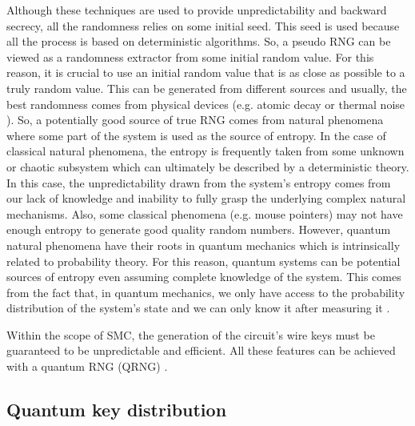 Although these techniques are used to provide unpredictability and backward secrecy, all the randomness relies on some initial seed. This seed is used because all the process is based on deterministic algorithms. So, a pseudo RNG can be viewed as a randomness extractor from some initial random value. For this reason, it is crucial to use an initial random value that is as close as possible to a truly random value. This can be generated from different sources and usually, the best randomness comes from physical devices (e.g. atomic decay \cite{Alkassar2005} or thermal noise \cite{GaviriaRojas2017}). So, a potentially good source of true RNG comes from natural phenomena where some part of the system is used as the source of entropy. In the case of classical natural phenomena, the entropy is frequently taken from some unknown or chaotic subsystem which can ultimately be described by a deterministic theory. In this case, the unpredictability drawn from the system’s entropy comes from our lack of knowledge and inability to fully grasp the underlying complex natural mechanisms. Also, some classical phenomena (e.g. mouse pointers) may not have enough entropy to generate good quality random numbers. However, quantum natural phenomena have their roots in quantum mechanics which is intrinsically related to probability theory. For this reason, quantum systems can be potential sources of entropy even assuming complete knowledge of the system. This comes from the fact that, in quantum mechanics, we only have access to the probability distribution of the system's state and we can only know it after measuring it \cite{HerreroCollantes2017}.

Within the scope of SMC, the generation of the circuit's wire keys must be guaranteed to be unpredictable and efficient. All these features can be achieved with a quantum RNG (QRNG) \cite{Ferreira2021}.

\subsection{Quantum key distribution}

